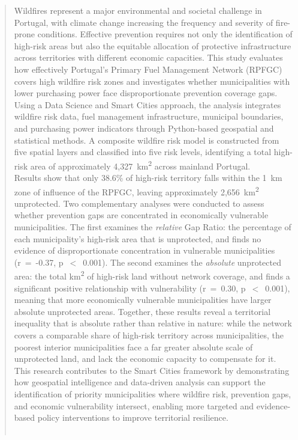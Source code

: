 \begin{abstract}


Wildfires represent a major environmental and societal challenge in
Portugal, with climate change increasing the frequency and severity
of fire-prone conditions. Effective prevention requires not only the
identification of high-risk areas but also the equitable allocation
of protective infrastructure across territories with different
economic capacities. This study evaluates how effectively Portugal's
Primary Fuel Management Network (RPFGC) covers high wildfire risk
zones and investigates whether municipalities with lower purchasing
power face disproportionate prevention coverage gaps.\\

Using a Data Science and Smart Cities approach, the analysis
integrates wildfire risk data, fuel management infrastructure,
municipal boundaries, and purchasing power indicators through
Python-based geospatial and statistical methods. A composite
wildfire risk model is constructed from five spatial layers and
classified into five risk levels, identifying a total high-risk
area of approximately 4,327~km\textsuperscript{2} across mainland
Portugal.\\

Results show that only 38.6\% of high-risk territory falls within
the 1~km zone of influence of the RPFGC, leaving approximately
2,656~km\textsuperscript{2} unprotected. Two complementary analyses
were conducted to assess whether prevention gaps are concentrated
in economically vulnerable municipalities. The first examines the
\textit{relative} Gap Ratio: the percentage of each
municipality's high-risk area that is unprotected, and finds
no evidence of disproportionate concentration in vulnerable
municipalities (r~=~-0.37, p~$<$~0.001). The second examines
the \textit{absolute} unprotected area: the total
km\textsuperscript{2} of high-risk land without network coverage, and finds a significant positive relationship with
vulnerability (r~=~0.30, p~$<$~0.001), meaning that more
economically vulnerable municipalities have larger absolute
unprotected areas. Together, these results reveal a territorial
inequality that is absolute rather than relative in nature:
while the network covers a comparable share of high-risk
territory across municipalities, the poorest interior
municipalities face a far greater absolute scale of unprotected
land, and lack the economic capacity to compensate for it.\\

This research contributes to the Smart Cities framework by
demonstrating how geospatial intelligence and data-driven analysis
can support the identification of priority municipalities where
wildfire risk, prevention gaps, and economic vulnerability
intersect, enabling more targeted and evidence-based policy
interventions to improve territorial resilience.\\
\\

\end{abstract}





